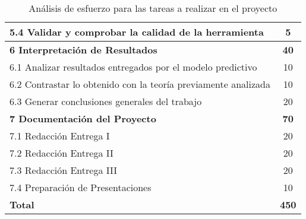 \begin{table}[H]
{{\begin{tabular}{@{}lc@{}}
5.4 Validar y comprobar la calidad de la herramienta & 5 \\ \midrule
{\bf 6 Interpretación de Resultados} & {\bf 40} \\ \midrule
6.1 Analizar resultados entregados por el modelo predictivo & 10 \\
6.2 Contrastar lo obtenido con la teoría previamente analizada & 10 \\
6.3 Generar conclusiones generales del trabajo & 20 \\ \midrule
{\bf 7 Documentación del Proyecto} & {\bf 70} \\ \midrule
7.1 Redacción Entrega I & 20 \\
7.2 Redacción Entrega II & 20 \\
7.3 Redacción Entrega III & 20 \\
7.4 Preparación de Presentaciones & 10 \\ \midrule
{\bf Total} & {\bf 450} \\ \bottomrule
\end{tabular}
}
}
\caption{Análisis de esfuerzo para las tareas a realizar en el proyecto}
\label{tab:anesfuerzo}
\end{table}